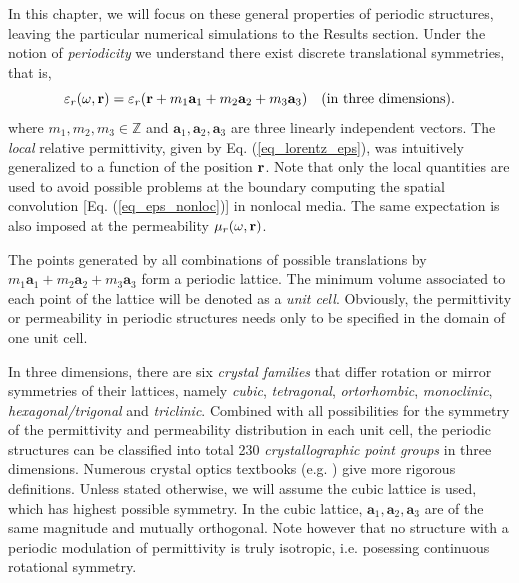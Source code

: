 In this chapter, we will focus on these general properties of periodic structures, leaving the particular numerical simulations to the Results section.
Under the notion of \textit{periodicity} we understand there exist discrete translational symmetries, that is, 
\begin{equation} \varepsilon_r(\omega,{\mathbf{r}}) = \varepsilon_r({\mathbf{r}} + m_1 \mathbf{a}_1 + m_2 \mathbf{a}_2 + m_3 \mathbf{a}_3) \quad\text{(in three dimensions).} \label{eq_trsym}\end{equation}
where $m_1, m_2, m_3 \in \mathbb{Z}$ and $\mathbf{a}_1, \mathbf{a}_2, \mathbf{a}_3$ are three linearly independent vectors. The \textit{local} relative permittivity, given by Eq. (\ref{eq_lorentz_eps}), was intuitively generalized to a function of the position ${\mathbf{r}}$. Note that only the local quantities are used to avoid possible problems at the boundary computing the spatial convolution [Eq. (\ref{eq_eps_nonloc})]  in nonlocal media. The same expectation is also imposed at the permeability $\mu_r(\omega,{\mathbf{r}})$. 

The points generated by all combinations of possible translations by $m_1 \mathbf{a}_1 + m_2 \mathbf{a}_2 + m_3 \mathbf{a}_3$ form a periodic lattice.
The minimum volume associated to each point of the lattice will be denoted as a \textit{unit cell}. Obviously, the permittivity or permeability in periodic structures needs only to be specified in the domain of one unit cell.

In three dimensions, there are six \textit{crystal families} that differ rotation or mirror symmetries of their lattices, namely \textit{cubic}, \textit{tetragonal}, \textit{ortorhombic}, \textit{monoclinic}, \textit{hexagonal/trigonal} and \textit{triclinic}. Combined with all possibilities for the symmetry of the permittivity and permeability distribution in each unit cell, the periodic structures can be classified into total 230 \textit{crystallographic point groups} in three dimensions. Numerous crystal optics textbooks (e.g. \cite[p. 678]{born1999book}) give more rigorous definitions. %
Unless stated otherwise, we will assume the cubic lattice is used, which has highest possible symmetry. In the cubic lattice, $\mathbf{a}_1, \mathbf{a}_2, \mathbf{a}_3$ are of the same magnitude and mutually orthogonal. Note however that no structure with a periodic modulation of permittivity is truly isotropic, i.e. posessing continuous rotational symmetry.

